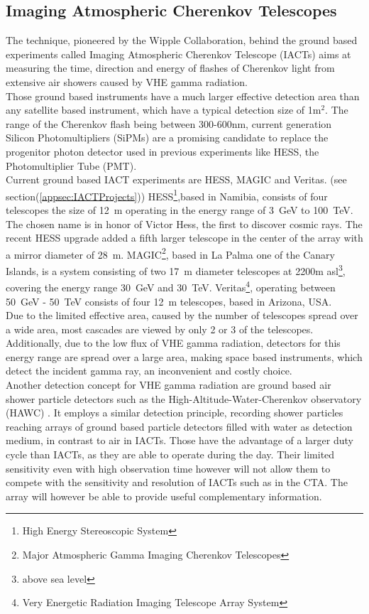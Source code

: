 \documentclass[12pt,article,type=msc,colorback,accentcolor=tud9c]{tudthesis}
\begin{document}
\subsection{Imaging Atmospheric Cherenkov Telescopes}
The technique, pioneered by the Wipple Collaboration, behind the ground based experiments called Imaging Atmospheric Cherenkov Telescope (IACTs) aims at measuring the time, direction and energy of flashes of Cherenkov light from extensive air showers caused by VHE gamma radiation.\\
Those ground based instruments have a much larger effective detection area than any satellite based instrument, which have a typical detection size of 1m$^2$. The range of the Cherenkov flash being between 300-600nm, current generation Silicon Photomultipliers (SiPMs) are a promising candidate to replace the progenitor photon detector used in previous experiments like HESS, the Photomultiplier Tube (PMT).\\

Current ground based IACT experiments are HESS, MAGIC and Veritas. (see section(\ref{appsec:IACTProjects})) HESS\footnote{High Energy Stereoscopic System},based in Namibia, consists of four telescopes the size of 12~m operating in the energy range of 3~GeV to 100~TeV. The chosen name is in honor of Victor Hess, the first to discover cosmic rays. The recent HESS upgrade added a fifth larger telescope in the center of the array with a mirror diameter of 28~m. MAGIC\footnote{Major Atmospheric Gamma Imaging Cherenkov Telescopes}, based in La Palma one of the Canary Islands, is a system consisting of two 17~m diameter telescopes at 2200m asl\footnote{above sea level}, covering the energy range 30~GeV and 30~TeV. Veritas\footnote{Very Energetic Radiation Imaging Telescope Array System}, operating between 50~GeV - 50~TeV consists of four 12~m telescopes, based in Arizona, USA. \\

Due to the limited effective area, caused by the number of telescopes spread over a wide area, most cascades are viewed by only 2 or 3 of the telescopes. Additionally, due to the low flux of VHE gamma radiation, detectors for this energy range are spread over a large area, making space based instruments, which detect the incident gamma ray, an inconvenient and costly choice.\\ 

Another detection concept for VHE gamma radiation are ground based air shower particle detectors such as the High-Altitude-Water-Cherenkov observatory (HAWC) \cite{HAWC}. It employs a similar detection principle, recording shower particles reaching arrays of ground based particle detectors filled with water as detection medium, in contrast to air in IACTs. Those have the advantage of a larger duty cycle than IACTs, as they are able to operate during the day. Their limited sensitivity even with high observation time however will not allow them to compete with the sensitivity and resolution of IACTs such as in the CTA. The array will however be able to provide useful complementary information. 
\end{document}

